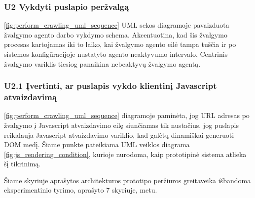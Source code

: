 \pagebreak

\subsubsection{U2 Vykdyti puslapio peržvalgą}

\ref{fig:perform_crawling_uml_sequence} UML sekos diagramoje pavaizduota žvalgymo agento darbo vykdymo schema. Akcentuotina, kad šis žvalgymo procesas kartojamas iki to laiko, kai žvalgymo agento eilė tampa tuščia ir po sistemos konfigūracijoje nustatyto agento neaktyvumo intervalo, Centrinis žvalgymo variklis tiesiog panaikina nebeaktyvų žvalgymo agentą.



\subsubsection{U2.1 Įvertinti, ar puslapis vykdo klientinį Javascript atvaizdavimą}

\ref{fig:perform_crawling_uml_sequence} diagramoje paminėta, jog URL adresas po žvalgymo į Javascript atvaizdavimo eilę siunčiamas tik nustačius, jog puslapis reikalauja Javascript atvaizdavimo variklio, kad galėtų dinamiškai generuoti DOM medį. Šiame punkte pateikiama UML veiklos diagrama \ref{fig:js_rendering_condition}, kurioje nurodoma, kaip prototipinė sistema atlieka šį tikrinimą.



Šiame skyriuje aprašytos architektūros prototipo peržiūros greitaveika išbandoma eksperimentinio tyrimo, aprašyto 7 skyriuje, metu.